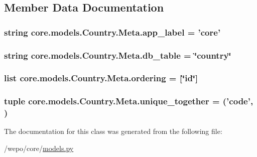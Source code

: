 \subsection{Member Data Documentation}
\hypertarget{classcore_1_1models_1_1Country_1_1Meta_a8dd201be91135b36e04c9a0f6ba17619}{
\subsubsection[{app\-\_\-label}]{\setlength{\rightskip}{0pt plus 5cm}string core.\-models.\-Country.\-Meta.\-app\-\_\-label = 'core'\hspace{0.3cm}{\ttfamily [static]}}}\label{classcore_1_1models_1_1Country_1_1Meta_a8dd201be91135b36e04c9a0f6ba17619}
\hypertarget{classcore_1_1models_1_1Country_1_1Meta_a1676c5aa35d719c3db2d23cac218e0d9}{
\subsubsection[{db\-\_\-table}]{\setlength{\rightskip}{0pt plus 5cm}string core.\-models.\-Country.\-Meta.\-db\-\_\-table = \char`\"{}country\char`\"{}\hspace{0.3cm}{\ttfamily [static]}}}\label{classcore_1_1models_1_1Country_1_1Meta_a1676c5aa35d719c3db2d23cac218e0d9}
\hypertarget{classcore_1_1models_1_1Country_1_1Meta_a114a8de726b6f882bd21b909d8a1a34d}{
\subsubsection[{ordering}]{\setlength{\rightskip}{0pt plus 5cm}list core.\-models.\-Country.\-Meta.\-ordering = \mbox{[}\char`\"{}id\char`\"{}\mbox{]}\hspace{0.3cm}{\ttfamily [static]}}}\label{classcore_1_1models_1_1Country_1_1Meta_a114a8de726b6f882bd21b909d8a1a34d}
\hypertarget{classcore_1_1models_1_1Country_1_1Meta_a711ed9131f1b18061962ae4523d0a716}{
\subsubsection[{unique\-\_\-together}]{\setlength{\rightskip}{0pt plus 5cm}tuple core.\-models.\-Country.\-Meta.\-unique\-\_\-together = ('{\bf code}', )\hspace{0.3cm}{\ttfamily [static]}}}\label{classcore_1_1models_1_1Country_1_1Meta_a711ed9131f1b18061962ae4523d0a716}


The documentation for this class was generated from the following file\-:\begin{DoxyCompactItemize}
\item 
/wepo/core/\hyperlink{models_8py}{models.\-py}\end{DoxyCompactItemize}
